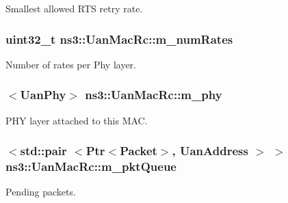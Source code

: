 Smallest allowed R\+TS retry rate. 

\subsubsection[{\texorpdfstring{m\+\_\+num\+Rates}{m_numRates}}]{\setlength{\rightskip}{0pt plus 5cm}uint32\+\_\+t ns3\+::\+Uan\+Mac\+Rc\+::m\+\_\+num\+Rates\hspace{0.3cm}{\ttfamily [private]}}\hypertarget{classns3_1_1UanMacRc_ae6371c67d521311d632f9bd80c657f2f}{}\label{classns3_1_1UanMacRc_ae6371c67d521311d632f9bd80c657f2f}


Number of rates per Phy layer. 

\subsubsection[{\texorpdfstring{m\+\_\+phy}{m_phy}}]{$<${\bf Uan\+Phy}$>$ ns3\+::\+Uan\+Mac\+Rc\+::m\+\_\+phy\hspace{0.3cm}{\ttfamily [private]}}\hypertarget{classns3_1_1UanMacRc_a48df505a0f7a921a3a279523e7390db8}{}\label{classns3_1_1UanMacRc_a48df505a0f7a921a3a279523e7390db8}


P\+HY layer attached to this M\+AC. 

\subsubsection[{\texorpdfstring{m\+\_\+pkt\+Queue}{m_pktQueue}}]{$<$std\+::pair $<${\bf Ptr}$<${\bf Packet}$>$, {\bf Uan\+Address} $>$ $>$ ns3\+::\+Uan\+Mac\+Rc\+::m\+\_\+pkt\+Queue\hspace{0.3cm}{\ttfamily [private]}}\hypertarget{classns3_1_1UanMacRc_ae1b75933c06f5f791dfba9065658adfd}{}\label{classns3_1_1UanMacRc_ae1b75933c06f5f791dfba9065658adfd}
Pending packets. 
